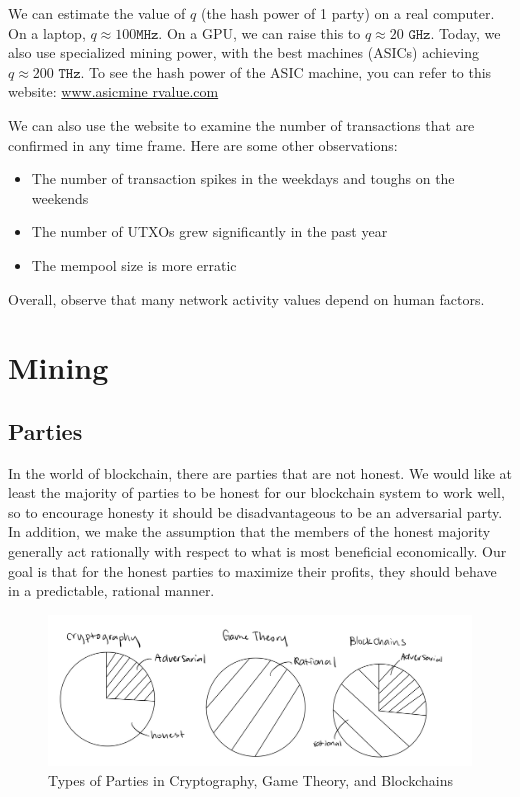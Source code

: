 We can estimate the value of $q$ (the hash power of 1 party) on a real computer. On a laptop, $q \approx 100 \texttt{MHz}$. On a GPU, we can raise this to $q \approx 20 \texttt{ GHz}$. Today, we also use specialized mining power, with the best machines (ASICs) achieving $q \approx 200 \texttt{ THz}$. To see the hash power of the ASIC machine, you can refer to this website: \href{www.asicminervalue.com}{www.asicmine
rvalue.com}

We can also use the website to examine the number of transactions that are confirmed in any time frame. Here are some other observations:
\begin{itemize}
    \item The number of transaction spikes in the weekdays and toughs on the weekends
    \item The number of UTXOs grew significantly in the past year
    \item The mempool size is more erratic
\end{itemize}
Overall, observe that many network activity values depend on human factors.

\section{Mining}
\subsection{Parties}
In the world of blockchain, there are parties that are not honest. We would like at least the majority of parties to be honest for our blockchain system to work well, so to encourage honesty it should be disadvantageous to be an adversarial party. In addition, we make the assumption that the members of the honest majority generally act rationally with respect to what is most beneficial economically. Our goal is that for the honest parties to maximize their profits, they should behave in a predictable, rational manner.

\begin{figure}[ht]
    \centering
    \includegraphics[scale = 0.4]{figures/rational.png}
    \caption{Types of Parties in Cryptography, Game Theory, and Blockchains}
    \label{fig:rational}
\end{figure}


